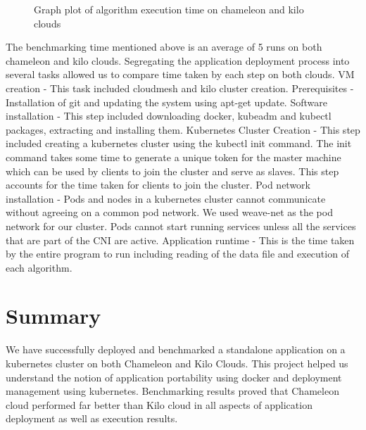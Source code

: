 \documentclass[9pt,twocolumn,twoside]{../../styles/osajnl}
\begin{document}
\begin{figure}[htbp]
\centering
{}
\caption{Graph plot of algorithm execution time on chameleon and kilo clouds}
\label{Graph plot of algorithm execution time on chameleon and kilo clouds}
\end{figure}

The benchmarking time mentioned above is an average of 5 runs on both
chameleon and kilo clouds. Segregating the application deployment
process into several tasks allowed us to compare time taken by each
step on both clouds.  VM creation - This task included cloudmesh and
kilo cluster creation.  Prerequisites - Installation of git and
updating the system using apt-get update.  Software installation -
This step included downloading docker, kubeadm and kubectl packages,
extracting and installing them.  Kubernetes Cluster Creation - This
step included creating a kubernetes cluster using the kubectl init
command. The init command takes some time to generate a unique token
for the master machine which can be used by clients to join the
cluster and serve as slaves. This step accounts for the time taken for
clients to join the cluster.  Pod network installation - Pods and
nodes in a kubernetes cluster cannot communicate without agreeing on a
common pod network. We used weave-net as the pod network for our
cluster. Pods cannot start running services unless all the services
that are part of the CNI are active.  Application runtime - This is
the time taken by the entire program to run including reading of the
data file and execution of each algorithm.

\section{Summary}

We have successfully deployed and benchmarked a standalone application
on a kubernetes cluster on both Chameleon and Kilo Clouds. This
project helped us understand the notion of application portability
using docker and deployment management using kubernetes.  Benchmarking
results proved that Chameleon cloud performed far better than Kilo
cloud in all aspects of application deployment as well as execution
results.
\end{document}
